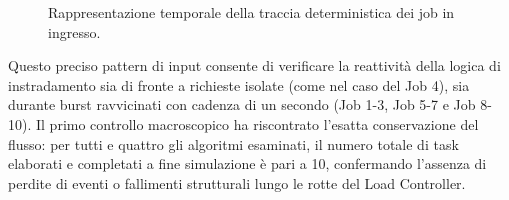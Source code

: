 ﻿\documentclass[a4paper,12pt]{article}
\begin{document}
\begin{figure}[H]
    \caption{Rappresentazione temporale della traccia deterministica dei job in ingresso.}
    \label{fig:trace_workload_timeline}
\end{figure}

Questo preciso pattern di input consente di verificare la reattività della logica di instradamento sia di fronte a richieste isolate (come nel caso del Job 4), sia durante burst ravvicinati con cadenza di un secondo (Job 1-3, Job 5-7 e Job 8-10). Il primo controllo macroscopico ha riscontrato l'esatta conservazione del flusso: per tutti e quattro gli algoritmi esaminati, il numero totale di task elaborati e completati a fine simulazione è pari a 10, confermando l'assenza di perdite di eventi o fallimenti strutturali lungo le rotte del Load Controller.
\end{document}
